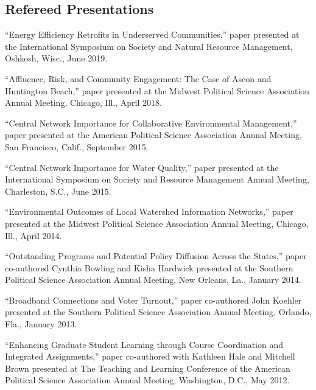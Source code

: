 \documentclass[11pt,letterpaper]{article}
\renewenvironment{itemize}{
  \begin{list}{}{
    \setlength{\leftmargin}{1.5em}
    \setlength{\itemsep}{0.25em}
    \setlength{\parskip}{0pt}
    \setlength{\parsep}{0.25em}
  }
}{
  \end{list}
}
\begin{document}
\subsection*{Refereed Presentations}
	\begin{itemize}\leftmargin=2pt\itemindent=-15pt
		
		\item ``Energy Efficiency Retrofits in Underserved Communities,'' paper presented at the International Symposium on Society and Natural Resource Management, Oshkosh, Wisc., June 2019.
		
		\item ``Affluence, Risk, and Community Engagement: The Case of Ascon and Huntington Beach,'' paper presented at the Midwest Political Science Association Annual Meeting, Chicago, Ill., April 2018.
		
		\item ``Central Network Importance for Collaborative Environmental Management,'' paper presented at the American Political Science Association Annual Meeting, San Francisco, Calif., September 2015.
		
		\item ``Central Network Importance for Water Quality,'' paper presented at the International Symposium on Society and Resource Management Annual Meeting, Charleston, S.C., June 2015.
		
		\item ``Environmental Outcomes of Local Watershed Information Networks,'' paper presented at the Midwest Political Science Association Annual Meeting, Chicago, Ill., April 2014.
		
		\item ``Outstanding Programs and Potential Policy Diffusion Across the States,'' paper co-authored Cynthia Bowling and Kisha Hardwick presented at the Southern Political Science Association Annual Meeting, New Orleans, La., January 2014. 
		
		\item ``Broadband Connections and Voter Turnout,'' paper co-authored John Koehler presented at the Southern Political Science Association Annual Meeting, Orlando, Fla., January 2013.
		
		\item ``Enhancing Graduate Student Learning through Course Coordination and Integrated Assignments,'' paper co-authored with Kathleen Hale and Mitchell Brown presented at The Teaching and Learning Conference of the American Political Science Association Annual Meeting, Washington, D.C., May 2012.
		

\end{itemize}
\end{document}
